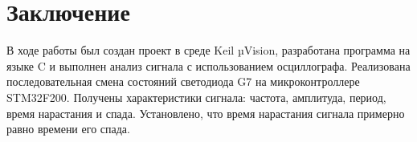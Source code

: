 \section*{Заключение}

В ходе работы был создан проект в среде Keil µVision, разработана программа на языке C и выполнен анализ сигнала с использованием осциллографа. Реализована последовательная смена состояний светодиода G7 на микроконтроллере STM32F200. Получены характеристики сигнала: частота, амплитуда, период, время нарастания и спада. Установлено, что время нарастания сигнала примерно равно времени его спада.


\newpage